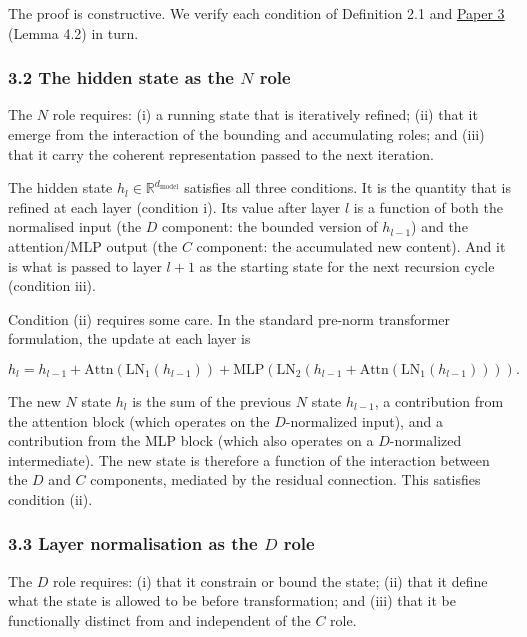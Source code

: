 \documentclass[12pt]{article}
\begin{document}
The proof is constructive. We verify each condition of Definition 2.1
and
\href{https://github.com/baardev/truevalue/blob/main/docnav/Research/papers/3_minimal-recursive-triadic-framework/3_minimal-recursive-triadic-framework.pdf}{Paper
3} (Lemma 4.2) in turn.

\subsubsection{\texorpdfstring{3.2 The hidden state as the \(N\)
role}{3.2 The hidden state as the N role}}\label{the-hidden-state-as-the-n-role}

The \(N\) role requires: (i) a running state that is iteratively
refined; (ii) that it emerge from the interaction of the bounding and
accumulating roles; and (iii) that it carry the coherent representation
passed to the next iteration.

The hidden state \(h_l \in \mathbb{R}^{d_\text{model}}\) satisfies all
three conditions. It is the quantity that is refined at each layer
(condition i). Its value after layer \(l\) is a function of both the
normalised input (the \(D\) component: the bounded version of
\(h_{l-1}\)) and the attention/MLP output (the \(C\) component: the
accumulated new content). And it is what is passed to layer \(l+1\) as
the starting state for the next recursion cycle (condition iii).

Condition (ii) requires some care. In the standard pre-norm transformer
formulation, the update at each layer is

\[h_l = h_{l-1} + \text{Attn}(\text{LN}_1(h_{l-1})) + \text{MLP}(\text{LN}_2(h_{l-1} + \text{Attn}(\text{LN}_1(h_{l-1})))).\]

The new \(N\) state \(h_l\) is the sum of the previous \(N\) state
\(h_{l-1}\), a contribution from the attention block (which operates on
the \(D\)-normalized input), and a contribution from the MLP block
(which also operates on a \(D\)-normalized intermediate). The new state
is therefore a function of the interaction between the \(D\) and \(C\)
components, mediated by the residual connection. This satisfies
condition (ii).

\subsubsection{\texorpdfstring{3.3 Layer normalisation as the \(D\)
role}{3.3 Layer normalisation as the D role}}\label{layer-normalisation-as-the-d-role}

The \(D\) role requires: (i) that it constrain or bound the state; (ii)
that it define what the state is allowed to be before transformation;
and (iii) that it be functionally distinct from and independent of the
\(C\) role.
\end{document}
